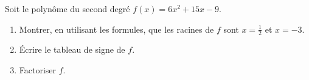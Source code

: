 
\begin{exercice}\label{exosmath-0092}

    Soit le polynôme du second degré \( f(x)=6x^2+15x-9\).
    \begin{enumerate}
        \item
            Montrer, en utilisant les formules, que les racines de \( f\) sont \( x=\frac{ 1 }{2}\) et \( x=-3\).
        \item
            Écrire le tableau de signe de \( f\).
        \item
            Factoriser \( f\).
    \end{enumerate}

\end{exercice}

